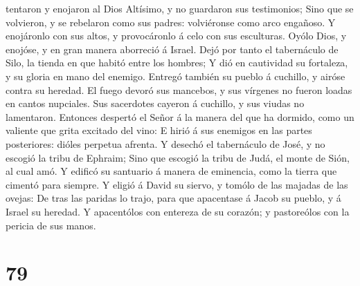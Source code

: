 tentaron y enojaron al Dios Altísimo, y no guardaron sus testimonios;
 Sino que se volvieron, y se rebelaron como sus padres:
volviéronse como arco engañoso.  Y enojáronlo con sus
altos, y provocáronlo á celo con sus esculturas.  Oyólo
Dios, y enojóse, y en gran manera aborreció á Israel.  Dejó
por tanto el tabernáculo de Silo, la tienda en que habitó entre los
hombres;  Y dió en cautividad su fortaleza, y su gloria en
mano del enemigo.  Entregó también su pueblo á cuchillo, y
airóse contra su heredad.  El fuego devoró sus mancebos, y
sus vírgenes no fueron loadas en cantos nupciales.  Sus
sacerdotes cayeron á cuchillo, y sus viudas no lamentaron. 
Entonces despertó el Señor á la manera del que ha dormido, como un
valiente que grita excitado del vino:  E hirió á sus
enemigos en las partes posteriores: dióles perpetua afrenta.
 Y desechó el tabernáculo de José, y no escogió la tribu de
Ephraim;  Sino que escogió la tribu de Judá, el monte de
Sión, al cual amó.  Y edificó su santuario á manera de
eminencia, como la tierra que cimentó para siempre.  Y
eligió á David su siervo, y tomólo de las majadas de las ovejas:
 De tras las paridas lo trajo, para que apacentase á Jacob
su pueblo, y á Israel su heredad.  Y apacentólos con
entereza de su corazón; y pastoreólos con la pericia de sus manos.

\hypertarget{section-78}{%
\section{79}\label{section-78}}

